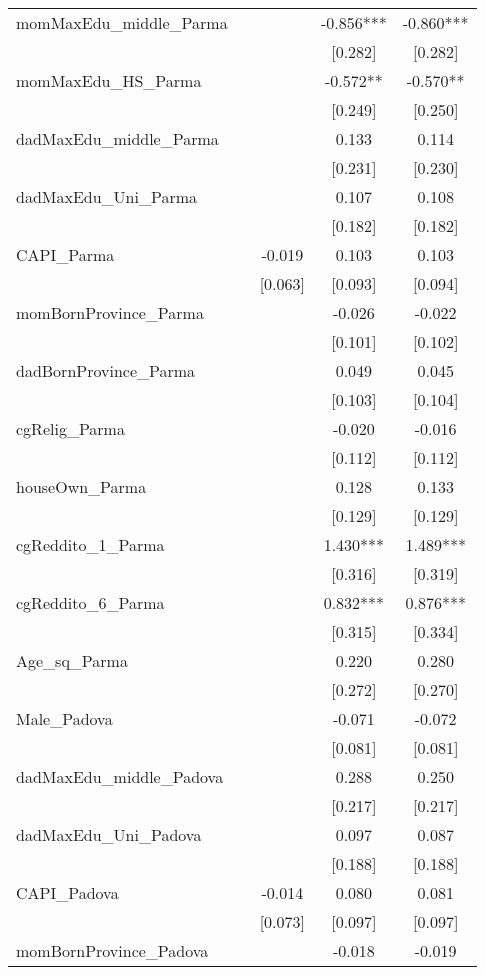 \documentclass[]{article}
\begin{document}
\begin{tabular}{lcccc}
momMaxEdu\_middle\_Parma &  &  & -0.856*** & -0.860*** \\
 &  &  & [0.282] & [0.282] \\
momMaxEdu\_HS\_Parma &  &  & -0.572** & -0.570** \\
 &  &  & [0.249] & [0.250] \\
dadMaxEdu\_middle\_Parma &  &  & 0.133 & 0.114 \\
 &  &  & [0.231] & [0.230] \\
dadMaxEdu\_Uni\_Parma &  &  & 0.107 & 0.108 \\
 &  &  & [0.182] & [0.182] \\
CAPI\_Parma &  & -0.019 & 0.103 & 0.103 \\
 &  & [0.063] & [0.093] & [0.094] \\
momBornProvince\_Parma &  &  & -0.026 & -0.022 \\
 &  &  & [0.101] & [0.102] \\
dadBornProvince\_Parma &  &  & 0.049 & 0.045 \\
 &  &  & [0.103] & [0.104] \\
cgRelig\_Parma &  &  & -0.020 & -0.016 \\
 &  &  & [0.112] & [0.112] \\
houseOwn\_Parma &  &  & 0.128 & 0.133 \\
 &  &  & [0.129] & [0.129] \\
cgReddito\_1\_Parma &  &  & 1.430*** & 1.489*** \\
 &  &  & [0.316] & [0.319] \\
cgReddito\_6\_Parma &  &  & 0.832*** & 0.876*** \\
 &  &  & [0.315] & [0.334] \\
Age\_sq\_Parma &  &  & 0.220 & 0.280 \\
 &  &  & [0.272] & [0.270] \\
Male\_Padova &  &  & -0.071 & -0.072 \\
 &  &  & [0.081] & [0.081] \\
dadMaxEdu\_middle\_Padova &  &  & 0.288 & 0.250 \\
 &  &  & [0.217] & [0.217] \\
dadMaxEdu\_Uni\_Padova &  &  & 0.097 & 0.087 \\
 &  &  & [0.188] & [0.188] \\
CAPI\_Padova &  & -0.014 & 0.080 & 0.081 \\
 &  & [0.073] & [0.097] & [0.097] \\
momBornProvince\_Padova &  &  & -0.018 & -0.019 \\

\end{tabular}
\end{document}
